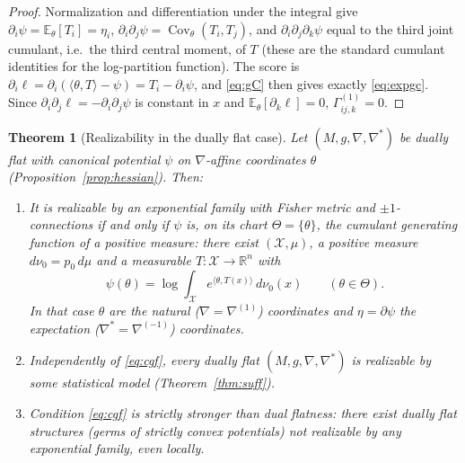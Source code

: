 \documentclass{amsart}
\newtheorem{theorem}{Theorem}
\theoremstyle{definition}
\theoremstyle{remark}
\begin{document}
\begin{proof}
Normalization and differentiation under the integral give
$\partial_{i}\psi=\mathbb E_{\theta}[T_{i}]=\eta_{i}$,
$\partial_{i}\partial_{j}\psi=\operatorname{Cov}_{\theta}(T_{i},T_{j})$, and
$\partial_{i}\partial_{j}\partial_{k}\psi$ equal to the third joint cumulant,
i.e.\ the third central moment, of $T$ (these are the standard cumulant
identities for the log-partition function). The score is
$\partial_{i}\ell=\partial_{i}(\langle\theta,T\rangle-\psi)=T_{i}-\partial_{i}\psi$,
and \eqref{eq:gC} then gives exactly \eqref{eq:expgc}. Since
$\partial_{i}\partial_{j}\ell=-\partial_{i}\partial_{j}\psi$ is constant in $x$
and $\mathbb E_{\theta}[\partial_{k}\ell]=0$, $\Gamma^{(1)}_{ij,k}=0$.
\end{proof}

\begin{theorem}[Realizability in the dually flat case]\label{thm:b}
Let $(M,g,\nabla,\nabla^{*})$ be dually flat with canonical potential $\psi$ on
$\nabla$-affine coordinates $\theta$ (Proposition~\ref{prop:hessian}). Then:
\begin{enumerate}
\item\label{it:exp} It is realizable by an exponential family with Fisher metric
and $\pm1$-connections \emph{if and only if} $\psi$ is, on its chart
$\Theta=\{\theta\}$, the cumulant generating function of a positive measure: there
exist $(\mathcal X,\mu)$, a positive measure $d\nu_{0}=p_{0}\,d\mu$ and a
measurable $T\colon\mathcal X\to\mathbb R^{n}$ with
\begin{equation}\label{eq:cgf}
  \psi(\theta)=\log\int_{\mathcal X}e^{\langle\theta,T(x)\rangle}\,d\nu_{0}(x)
  \qquad(\theta\in\Theta).
\end{equation}
In that case $\theta$ are the natural ($\nabla=\nabla^{(1)}$) coordinates and
$\eta=\partial\psi$ the expectation ($\nabla^{*}=\nabla^{(-1)}$) coordinates.
\item\label{it:always} Independently of \eqref{eq:cgf}, every dually flat
$(M,g,\nabla,\nabla^{*})$ is realizable by \emph{some} statistical model
(Theorem~\ref{thm:suff}).
\item\label{it:obstruction} Condition \eqref{eq:cgf} is strictly stronger than
dual flatness: there exist dually flat structures (germs of strictly convex
potentials) not realizable by any exponential family, even locally.
\end{enumerate}
\end{theorem}
\end{document}

